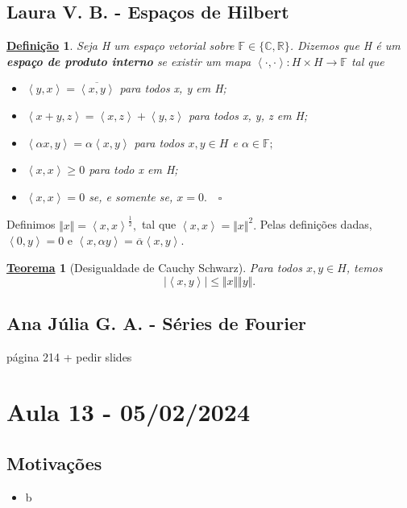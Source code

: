 \documentclass{article}
\newtheorem*{def*}{\underline{Defini\c c\~ao}}
\newtheorem*{theorem*}{\underline{Teorema}}
\begin{document}
\subsection{Laura V. B. - Espaços de Hilbert}
 \begin{def*}
   Seja H um espaço vetorial sobre \(\mathbb{F}\in\{\mathbb{C}, \mathbb{R}\}\). Dizemos que H é um \textbf{espaço de produto interno} se existir um mapa
   \(\left< \cdot , \cdot  \right>:H \times H\rightarrow \mathbb{F}\) tal que 
  \begin{itemize}
    \item[1)] \(\left< y, x \right> = \overline{\left< x, y \right>}\) para todos x, y em H; 
    \item[2)] \(\left< x + y, z \right> = \left< x, z \right> + \left< y, z \right>\) para todos x, y, z em H;
    \item[3)] \(\left< \alpha x, y \right> = \alpha \left< x, y \right>\) para todos \(x, y\in H\) e \(\alpha \in \mathbb{F};\)
    \item[4)] \(\left< x, x \right> \geq 0\) para todo x em H; 
    \item[5)] \(\left< x, x \right> = 0\) se, e somente se, \(x=0.\quad \square\)
  \end{itemize}
 \end{def*}
  Definimos \(\Vert x \Vert = \left< x, x \right>^{\frac{1}{2}},\) tal que \(\left< x, x \right> = \Vert x \Vert^{2}.\) Pelas definições dadas, \(\left< 0, y \right> = 0\) e 
 \(\left< x, \alpha y \right> = \overline{\alpha }\left< x, y \right>.\) 

 \hypertarget{cauchy_schwarz}{
  \begin{theorem*}[Desigualdade de Cauchy Schwarz]
    Para todos \(x, y\in H\), temos 
      \[
        |\left< x, y \right>|\leq \Vert x \Vert \Vert y \Vert.
      \]  
  \end{theorem*}}

\subsection{Ana Júlia G. A. - Séries de Fourier}
  página 214 + pedir slides
\newpage

\section{Aula 13 - 05/02/2024}
\subsection{Motivações} 
 \begin{itemize}
   \item b
 \end{itemize}
\end{document}
